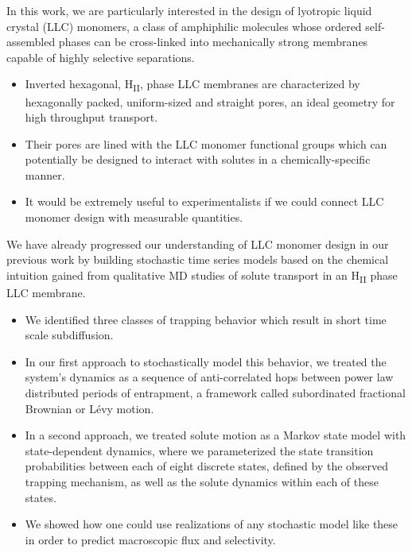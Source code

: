 \documentclass[journal=jpcbfk,manuscript=article]{achemso}
\begin{document}
  In this work, we are particularly interested in the design of lyotropic liquid crystal (LLC)
  monomers, a class of amphiphilic molecules whose ordered self-assembled phases can be 
  cross-linked into mechanically strong membranes capable of highly selective separations.
  \begin{itemize}
  	\item Inverted hexagonal, H\textsubscript{II}, phase LLC membranes are characterized
  	by hexagonally packed, uniform-sized and straight pores, an ideal geometry for high 
  	throughput transport.
	\item Their pores are lined with the LLC monomer functional groups which can
	potentially be designed to interact with solutes in a chemically-specific manner.
	\item It would be extremely useful to experimentalists if we could connect LLC monomer
	design with measurable quantities.
  \end{itemize}
  
  We have already progressed our understanding of LLC monomer design in our previous work
  by building stochastic time series models based on the chemical intuition gained
  from qualitative MD studies of solute transport in an H\textsubscript{II} phase LLC
  membrane.~\cite{coscia_chemically_2019,coscia_capturing_2020}
  \begin{itemize}
    \item We identified three classes of trapping behavior which result in short time scale
    subdiffusion.
    \item In our first approach to stochastically model this behavior, we treated the
    system's dynamics as a sequence of anti-correlated hops between power law distributed
    periods of entrapment, a framework called subordinated fractional Brownian or L\'evy
    motion.
    \item In a second approach, we treated solute motion as a Markov state model with 
    state-dependent dynamics, where we parameterized the state transition probabilities 
    between each of eight discrete states, defined by the observed trapping mechanism, 
    as well as the solute dynamics within each of these states. 
    \item We showed how one could use realizations of any stochastic model like these in
    order to predict macroscopic flux and selectivity. 
  \end{itemize}
  
\end{document}
